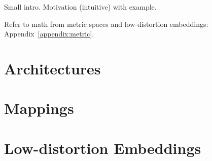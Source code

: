 Small intro. Motivation (intuitive) with example. \blindtext[4]

Refer to math from metric spaces and low-distortion embeddings: Appendix~\ref{appendix:metric}.


\section{Architectures}
\Blindtext[5]

\section{Mappings}
\Blindtext[5]

\section{Low-distortion Embeddings}
\Blindtext[5]